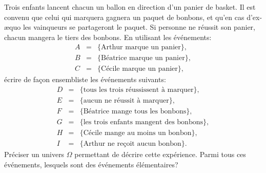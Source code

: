 \documentclass[a4paper,12pt,reqno]{amsart}
\begin{document}


\begin{exo}

  Trois enfants lancent chacun un ballon en direction d'un panier de basket. Il est convenu que celui qui marquera gagnera un paquet de bonbons, et qu'en cas d'ex-æquo les vainqueurs se partageront le paquet. Si personne ne réussit son panier, chacun mangera le tiers des bonbons. En utilisant les événements:
  \begin{eqnarray*}
    A & = & \{\text{Arthur marque un panier}\},\\
    B & = & \{\text{Béatrice marque un panier}\},\\
    C & = & \{\text{Cécile marque un panier}\},
  \end{eqnarray*}
  écrire de façon ensembliste les événements suivants:
  \begin{eqnarray*}
    D & = & \{\text{tous les trois réussissent à marquer}\},\\
    E & = & \{\text{aucun ne réussit à marquer}\},\\
    F & = & \{\text{Béatrice mange tous les bonbons}\},\\
    G & = & \{\text{les trois enfants mangent des bonbons}\},\\
    H & = & \{\text{Cécile mange au moins un bonbon}\},\\
    I & = & \{\text{Arthur ne reçoit aucun bonbon}\}.
  \end{eqnarray*}
  Préciser un univers $\Omega$ permettant de décrire cette expérience. Parmi tous ces événements, lesquels sont des événements élémentaires?

\end{exo}
\end{document}
